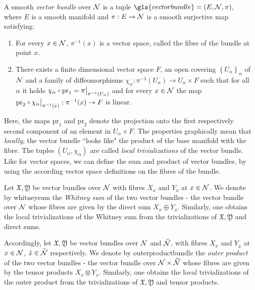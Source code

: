 \begin{definition}
	A smooth \emph{vector bundle} over $\mathcal{N}$ is a tuple $\gls{vectorbundle} = (E,\N, \pi)$, where $E$ is a smooth manifold and $\pi : E \to \mathcal{N}$ is a smooth surjective map satisfying:
	\begin{enumerate}
		\item For every $x \in \mathcal{N}$, $\pi^{-1}(x)$ is a vector space, called the fibre of the bundle at point $x$.
		\item There exists a finite dimensional vector space $F$, an open covering $\left\{ U_\alpha\right\}_\alpha$ of $\mathcal{N}$ and a family of diffeomorphisms $\chi_\alpha : \pi^{-1}(U_\alpha) \to U_\alpha \times F$ such that for all $\alpha$ it holds $\chi_\alpha \comp \text{pr}_1 =  \restr{\pi}{\pi^{-1}(U_\alpha)}$ and for every $x \in \mathcal{N}$ the map $\text{pr}_2 \comp \restr{\chi_\alpha}{\pi^{-1}(x)} : \pi^{-1}(x) \to F$ is linear.
	\end{enumerate}
\end{definition}
Here, the maps $\text{pr}_1$ and $\text{pr}_2$ denote the projection onto the first respectively second component of an element in $U_\alpha \times F$. The properties graphically mean that \emph{locally}, the vector bundle ``looks like" the product of the base manifold with the fibre. The tuples $(U_\alpha, \chi_\alpha)$ are called \emph{local trivializations} of the vector bundle. Like for vector spaces, we can define the sum and product of vector bundles, by using the according vector space definitions on the fibres of the bundle.\par
Let $\mathfrak{X}, \mathfrak{Y}$ be vector bundles over $\mathcal{N}$ with fibres $X_x$ and $Y_x$ at $x \in \mathcal{N}$. We denote by \gls{whitneysum} the \emph{Whitney sum} of the two vector bundles - the vector bundle over $\mathcal{N}$ whose fibres are given by the direct sum $X_x \oplus Y_x$. Similarly, one obtains the local trivializations of the Whitney sum from the trivializations of $\mathfrak{X}, \mathfrak{Y}$ and direct sums.\par
Accordingly, let $\mathfrak{X}, \mathfrak{Y}$ be vector bundles over $\mathcal{N}$ and $\widetilde{\mathcal{N}}$, with fibres $X_x$ and $Y_{\tilde{x}}$ at $x \in \mathcal{N}$, $\tilde{x} \in \widetilde{\mathcal{N}}$ respectively. We denote by \gls{outerproductbundle} the \emph{outer product} of the two vector bundles - the vector bundle over $\mathcal{N} \times \widetilde{\mathcal{N}}$ whose fibres are given by the tensor products $X_x \otimes Y_x$. Similarly, one obtains the local trivializations of the outer product from the trivializations of $\mathfrak{X}, \mathfrak{Y}$ and tensor products. \par
